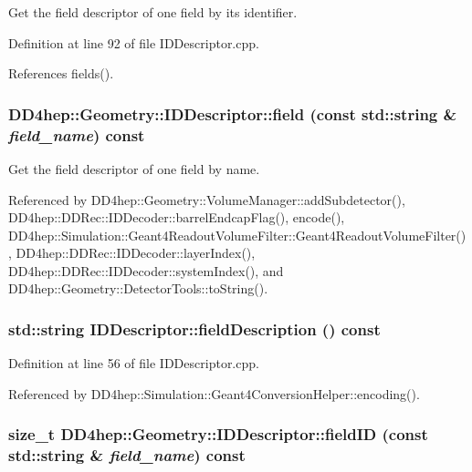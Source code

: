 Get the field descriptor of one field by its identifier. 

Definition at line 92 of file IDDescriptor.cpp.

References fields().\hypertarget{class_d_d4hep_1_1_geometry_1_1_i_d_descriptor_a87e1718a63ccdf8ed06c8acdaf14f617}{
\subsubsection[{field}]{ DD4hep::Geometry::IDDescriptor::field (const std::string \& {\em field\_\-name}) const}}
\label{class_d_d4hep_1_1_geometry_1_1_i_d_descriptor_a87e1718a63ccdf8ed06c8acdaf14f617}


Get the field descriptor of one field by name. 

Referenced by DD4hep::Geometry::VolumeManager::addSubdetector(), DD4hep::DDRec::IDDecoder::barrelEndcapFlag(), encode(), DD4hep::Simulation::Geant4ReadoutVolumeFilter::Geant4ReadoutVolumeFilter(), DD4hep::DDRec::IDDecoder::layerIndex(), DD4hep::DDRec::IDDecoder::systemIndex(), and DD4hep::Geometry::DetectorTools::toString().\hypertarget{class_d_d4hep_1_1_geometry_1_1_i_d_descriptor_af80368b77245c1d1b0aa2bb465621eb2}{
\subsubsection[{fieldDescription}]{\setlength{\rightskip}{0pt plus 5cm}std::string IDDescriptor::fieldDescription () const}}
\label{class_d_d4hep_1_1_geometry_1_1_i_d_descriptor_af80368b77245c1d1b0aa2bb465621eb2}


Definition at line 56 of file IDDescriptor.cpp.

Referenced by DD4hep::Simulation::Geant4ConversionHelper::encoding().\hypertarget{class_d_d4hep_1_1_geometry_1_1_i_d_descriptor_aa7476c8d4708ec4e103ea3bf0220d162}{
\subsubsection[{fieldID}]{\setlength{\rightskip}{0pt plus 5cm}size\_\-t DD4hep::Geometry::IDDescriptor::fieldID (const std::string \& {\em field\_\-name}) const}}
\label{class_d_d4hep_1_1_geometry_1_1_i_d_descriptor_aa7476c8d4708ec4e103ea3bf0220d162}



